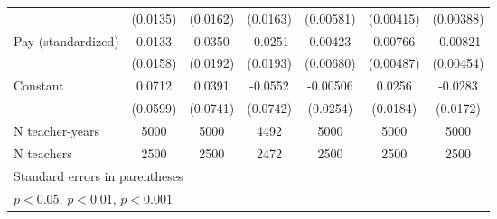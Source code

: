 {\begin{tabular}{l*{6}{c}}
            &    (0.0135)         &    (0.0162)         &    (0.0163)         &   (0.00581)         &   (0.00415)         &   (0.00388)         \\
[1em]
Pay (standardized)&      0.0133         &      0.0350         &     -0.0251         &     0.00423         &     0.00766         &    -0.00821         \\
            &    (0.0158)         &    (0.0192)         &    (0.0193)         &   (0.00680)         &   (0.00487)         &   (0.00454)         \\
[1em]
Constant    &      0.0712         &      0.0391         &     -0.0552         &    -0.00506         &      0.0256         &     -0.0283         \\
            &    (0.0599)         &    (0.0741)         &    (0.0742)         &    (0.0254)         &    (0.0184)         &    (0.0172)         \\
\hline
N teacher-years&        5000         &        5000         &        4492         &        5000         &        5000         &        5000         \\
N teachers  &        2500         &        2500         &        2472         &        2500         &        2500         &        2500         \\
\hline\hline
\multicolumn{7}{l}{\footnotesize Standard errors in parentheses}\\
\multicolumn{7}{l}{\footnotesize \sym{*} \(p<0.05\), \sym{**} \(p<0.01\), \sym{***} \(p<0.001\)}\\
\end{tabular}
}
